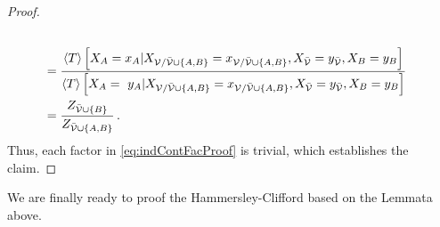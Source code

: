 \begin{proof}
\begin{align*}
{		} \\
		& =
		\frac{
			 \sbnormationofwrt{\hypercore}{
			 	\indexedcatvariableof{\nodesa}
			 }{\indexedcatvariableof{\nodes/\thirdnodes\cup\{\nodesa,\nodesb\}}, \catvariableof{\thirdnodes}=\seccatindexof{\thirdnodes}, \catvariableof{\nodesb} = \seccatindexof{\nodesb}}
		}{
			 \sbnormationofwrt{\hypercore}{
			 	\catvariableof{\nodesa} = \seccatindexof{\nodesa}
			 }{\indexedcatvariableof{\nodes/\thirdnodes\cup\{\nodesa,\nodesb\}}, \catvariableof{\thirdnodes}=\seccatindexof{\thirdnodes},\catvariableof{\nodesb} = \seccatindexof{\nodesb}}
		} \\
		& =
		\frac{
			Z_{\thirdnodes\cup\{\nodesb\}}
		}{
			Z_{\thirdnodes\cup\{\nodesa,\nodesb\}}
		} \, .
	\end{align*}
	Thus, each factor in \eqref{eq:indContFacProof} is trivial, which establishes the claim.
\end{proof}

We are finally ready to proof the Hammersley-Clifford  based on the Lemmata above.

